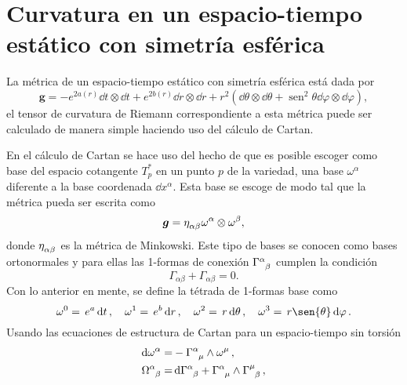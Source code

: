\chapter{Curvatura en un espacio-tiempo estático con simetría esférica}

La métrica de un espacio-tiempo estático con simetría esférica está dada por
\begin{equation}
    \bm{g}=-e^{2 a(r)} \dd{t} \otimes \dd{t}+e^{2 b(r)} \dd{r} \otimes \dd{r} +r^{2}\left(\dd{\theta} \otimes \dd{\theta}+\operatorname{sen}^{2} \theta \dd{\varphi} \otimes \dd{\varphi}\right),
\end{equation}
el tensor de curvatura de Riemann correspondiente a esta métrica puede ser calculado de manera simple haciendo uso del cálculo de Cartan. 

En el cálculo de Cartan se hace uso del hecho de que es posible escoger como base del espacio cotangente $T^{*}_p$ en un punto $p$ de la variedad, una base $\omega^{\alpha}$ diferente a la base coordenada $\dd{x^\alpha}$. Esta base se escoge de modo tal que la métrica pueda ser escrita como 
\begin{equation}
    \bm{g}=\tensor{\eta}{_\alpha_\beta} \omega^{\alpha} \otimes \omega^{\beta},
\end{equation}
donde $\tensor{\eta}{_\alpha_\beta}$ es la métrica de Minkowski. Este tipo de bases se conocen como bases ortonormales y para ellas las 1-formas de conexión $\tensor{\Gamma}{^\alpha_\beta}$ cumplen la condición
\begin{equation}
    \Gamma_{\alpha \beta}+\Gamma_{\alpha \beta}=0. \label{skew}
\end{equation}
Con lo anterior en mente, se define la tétrada de 1-formas base como
\begin{equation}
    \omega^0=\,e^{a}\dd{t}, \quad
    \omega^1=\,e^{b}\dd{r}, \quad
    \omega^2=\,r\dd{\theta}, \quad
    \omega^3=\,r\sen{\theta}\dd{\varphi}.
    \label{tetrada}
\end{equation}
Usando las ecuaciones de estructura de Cartan para un espacio-tiempo sin torsión
\begin{subequations}
\begin{align}
    \dd{\omega^\alpha} =& -\tensor{\Gamma}{^\alpha_ \mu} \wedge \omega^{\mu}\,, \label{1SE}\\
    \tensor{\Omega}{^\alpha_\beta} =& \dd{ \tensor{\Gamma}{^\alpha_\beta}} + \tensor{\Gamma}{^\alpha_\mu}  \wedge \tensor{\Gamma}{^\mu_\beta}\,, \label{2SE}
\end{align}
\end{subequations}
